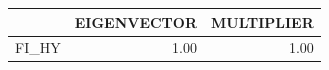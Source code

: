 \begin{tabular}{rrr}
  \hline
 & EIGENVECTOR & MULTIPLIER \\ 
  \hline
FI\_HY & 1.00 & 1.00 \\ 
   \hline
\end{tabular}
